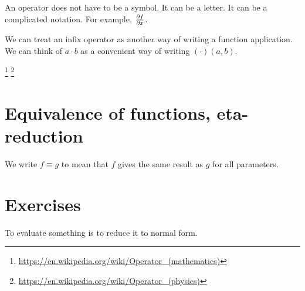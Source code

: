 An operator does not have to be a symbol.
It can be a letter.
It can be a complicated notation.
For example, \(\pdv{f}{x}\).

We can treat an infix operator as another way of writing a function application.
We can think of \(a \cdot b\) as a convenient way of writing \((\cdot)(a,b)\).

\footnote{\url{https://en.wikipedia.org/wiki/Operator_(mathematics)}}%
\footnote{\url{https://en.wikipedia.org/wiki/Operator_(physics)}}

\section{Equivalence of functions, eta-reduction}
\label{sec:function-equivalence}

We write \(f \equiv g\) to mean that \(f\) gives the same result as \(g\) for all parameters.

\section{Exercises}

To evaluate something is to reduce it to normal form.


\ShowAnswers
